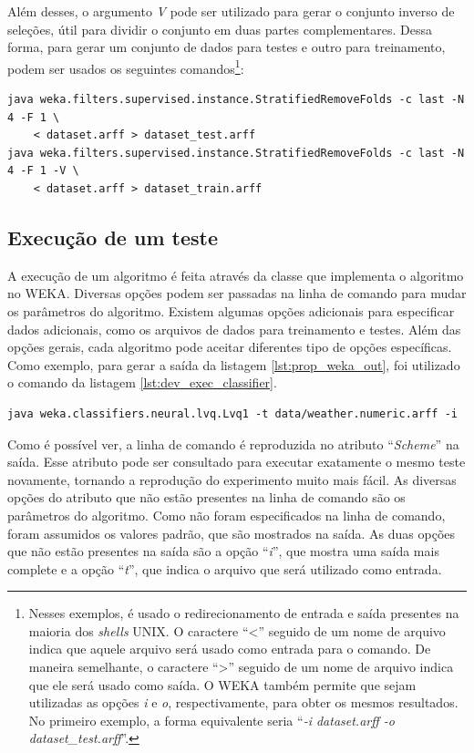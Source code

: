 Além desses, o argumento \emph{V} pode ser utilizado para gerar o conjunto inverso de seleções, útil para dividir o conjunto em duas partes complementares. Dessa forma, para gerar um conjunto de dados para testes e outro para treinamento, podem ser usados os seguintes comandos\footnote{Nesses exemplos, é usado o redirecionamento de entrada e saída presentes na maioria dos \emph{shells} UNIX. O caractere ``<'' seguido de um nome de arquivo indica que aquele arquivo será usado como entrada para o comando. De maneira semelhante, o caractere ``>'' seguido de um nome de arquivo indica que ele será usado como saída. O WEKA também permite que sejam utilizadas as opções \emph{i} e \emph{o}, respectivamente, para obter os mesmos resultados. No primeiro exemplo, a forma equivalente seria ``\emph{-i dataset.arff -o dataset\_test.arff}''.}:

\begin{lstlisting}[caption=Filtro para geração de partições para \emph{cross-validation}, label=lst:dev_filter]
java weka.filters.supervised.instance.StratifiedRemoveFolds -c last -N 4 -F 1 \
    < dataset.arff > dataset_test.arff
java weka.filters.supervised.instance.StratifiedRemoveFolds -c last -N 4 -F 1 -V \
    < dataset.arff > dataset_train.arff
\end{lstlisting}

\subsection{Execução de um teste}

A execução de um algoritmo é feita através da classe que implementa o algoritmo no WEKA. Diversas opções podem ser passadas na linha de comando para mudar os parâmetros do algoritmo. Existem algumas opções adicionais para especificar dados adicionais, como os arquivos de dados para treinamento e testes. Além das opções gerais, cada algoritmo pode aceitar diferentes tipo de opções específicas. Como exemplo, para gerar a saída da listagem \ref{lst:prop_weka_out}, foi utilizado o comando da listagem \ref{lst:dev_exec_classifier}.

\vspace{0.5cm}
\begin{lstlisting}[caption=Execução de um classificador, label=lst:dev_exec_classifier]
java weka.classifiers.neural.lvq.Lvq1 -t data/weather.numeric.arff -i
\end{lstlisting}
\vspace{0.5cm}

Como é possível ver, a linha de comando é reproduzida no atributo ``\emph{Scheme}'' na saída. Esse atributo pode ser consultado para executar exatamente o mesmo teste novamente, tornando a reprodução do experimento muito mais fácil. As diversas opções do atributo que não estão presentes na linha de comando são os parâmetros do algoritmo. Como não foram especificados na linha de comando, foram assumidos os valores padrão, que são mostrados na saída. As duas opções que não estão presentes na saída são a opção ``\emph{i}'', que mostra uma saída mais complete e a opção ``\emph{t}'', que indica o arquivo que será utilizado como entrada.

